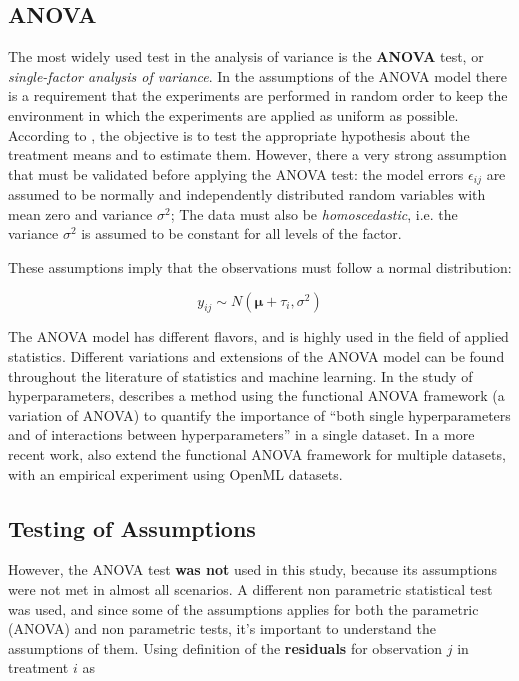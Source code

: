 \subsection{ANOVA}

The most widely used test in the analysis of variance is the \textbf{ANOVA} test, or \textit{single-factor analysis of variance}. In the assumptions of the ANOVA model there is a requirement that the experiments are performed in random order to keep the environment in which the experiments are applied as uniform as possible. According to \cite{montgomery2017design}, the objective is to test the appropriate hypothesis about the treatment means and to estimate them. However, there a very strong assumption that must be validated before applying the ANOVA test: the model errors $\epsilon_{ij}$ are assumed to be normally and independently distributed random variables with mean zero and variance $\sigma^2$; The data must also be \textit{homoscedastic}, i.e. the variance $\sigma^2$ is assumed to be constant for all levels of the factor.

These assumptions imply that the observations must follow a normal distribution:

$$y_{ij} \sim N(\bm{\mu} + \tau_i, \sigma^2)$$

The ANOVA model has different flavors, and is highly used in the field of applied statistics. Different variations and extensions of the ANOVA model can be found throughout the literature of statistics and machine learning. In the study of hyperparameters, \cite{hoos201x4efficient} describes a method using the functional ANOVA framework (a variation of ANOVA) to quantify the importance of ``both single hyperparameters and of interactions between hyperparameters'' in a single dataset. In a more recent work, \cite{van2017empirical} also extend the functional ANOVA framework for multiple datasets, with an empirical experiment using OpenML datasets.

\subsection{Testing of Assumptions}

However, the ANOVA test \textbf{was not} used in this study, because its assumptions were not met in almost all scenarios. A different non parametric statistical test was used, and since some of the assumptions applies for both the parametric (ANOVA) and non parametric tests, it's important to understand the assumptions of them. Using \cite{montgomery2017design} definition of the \textbf{residuals} for observation $j$ in treatment $i$ as

